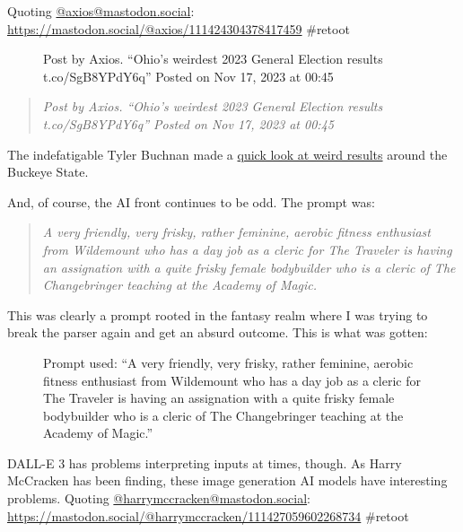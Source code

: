 Quoting \href{https://mastodon.social/@axios/}{@axios@mastodon.social}:
\url{https://mastodon.social/@axios/111424304378417459} \#retoot

\begin{figure}
\centering
{}
\caption{Post by Axios. ``Ohio's weirdest 2023 General Election results
t.co/SgB8YPdY6q'' Posted on Nov 17, 2023 at 00:45}
\end{figure}

\begin{quote}
\emph{Post by Axios. ``Ohio's weirdest 2023 General Election results
t.co/SgB8YPdY6q'' Posted on Nov 17, 2023 at 00:45}
\end{quote}

The indefatigable Tyler Buchnan made a
\href{https://www.axios.com/local/columbus/2023/11/16/ohio-weird-election-results-2023?utm_medium=social&utm_source=twitter&utm_campaign=editorial}{quick
look at weird results} around the Buckeye State.

And, of course, the AI front continues to be odd. The prompt was:

\begin{quote}
\emph{A very friendly, very frisky, rather feminine, aerobic fitness
enthusiast from Wildemount who has a day job as a cleric for The
Traveler is having an assignation with a quite frisky female bodybuilder
who is a cleric of The Changebringer teaching at the Academy of Magic.}
\end{quote}

This was clearly a prompt rooted in the fantasy realm where I was trying
to break the parser again and get an absurd outcome. This is what was
gotten:

\begin{figure}
\centering
{}
\caption{Prompt used: ``A very friendly, very frisky, rather feminine,
aerobic fitness enthusiast from Wildemount who has a day job as a cleric
for The Traveler is having an assignation with a quite frisky female
bodybuilder who is a cleric of The Changebringer teaching at the Academy
of Magic.''}
\end{figure}

DALL-E 3 has problems interpreting inputs at times, though. As Harry
McCracken has been finding, these image generation AI models have
interesting problems. Quoting
\href{https://mastodon.social/@harrymccracken/}{@harrymccracken@mastodon.social}:
\url{https://mastodon.social/@harrymccracken/111427059602268734}
\#retoot

